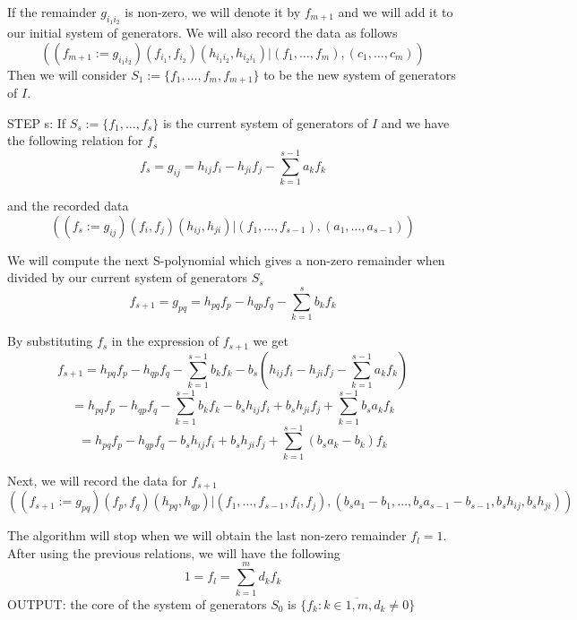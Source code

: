 \documentclass{article}
\theoremstyle{plain}
\begin{document}
If the remainder $g_{i_1i_2}$ is non-zero, we will denote it by $f_{m+1}$ and we will add it to our initial system of generators. We will also record the data as follows
$$((f_{m+1}:=g_{i_1i_2})(f_{i_1},f_{i_2})(h_{i_1i_2},h_{i_2i_1})| (f_1,\ldots,f_m),(c_1,\ldots,c_m))$$ 
Then we will consider $S_1:=\{f_1,\ldots,f_m,f_{m+1}\}$ to be the new system of generators of $I$.

STEP s:  If $S_s:=\{f_1,\ldots,f_{s}\}$ is the current system of generators of $I$ and we have the following relation for $f_s$
$$f_s=g_{ij}=h_{ij}f_i-h_{ji}f_j-\displaystyle\sum_{k=1}^{s-1} a_kf_k$$

and the recorded data 
$$((f_{s}:=g_{ij})(f_{i},f_{j})(h_{ij},h_{ji})| (f_1,\ldots,f_{s-1}),(a_1,\ldots,a_{s-1}))$$

We will compute the next S-polynomial which gives a non-zero remainder when divided by our current system of generators $S_s$
$$f_{s+1}=g_{pq}=h_{pq}f_p-h_{qp}f_q-\displaystyle\sum_{k=1}^s b_kf_k$$
  
By substituting $f_s$ in the expression of $f_{s+1}$ we get 
$$f_{s+1}= h_{pq}f_p-h_{qp}f_q-\displaystyle\sum_{k=1}^{s-1} b_kf_k-b_s(h_{ij}f_i-h_{ji}f_j-\displaystyle\sum_{k=1}^{s-1} a_kf_k)$$
$$= h_{pq}f_p-h_{qp}f_q-\displaystyle\sum_{k=1}^{s-1} b_kf_k-b_sh_{ij}f_i+b_sh_{ji}f_j+\displaystyle\sum_{k=1}^{s-1} b_sa_kf_k$$
$$= h_{pq}f_p-h_{qp}f_q-b_sh_{ij}f_i+b_sh_{ji}f_j+\displaystyle\sum_{k=1}^{s-1} (b_sa_k-b_k)f_k$$

 Next, we will record the data for $f_{s+1}$
$$((f_{s+1}:=g_{pq})(f_{p},f_{q})(h_{pq},h_{qp})| (f_1,\ldots,f_{s-1},f_i,f_j),(b_sa_1-b_1,\ldots,b_sa_{s-1}-b_{s-1},b_sh_{ij},b_sh_{ji}))$$


The algorithm will stop when we will obtain the last non-zero remainder $f_l=1$. After using the previous relations, we will have the following
$$1=f_l=\displaystyle\sum_{k=1}^{m} d_kf_k$$
OUTPUT:
the core of the system of generators $S_0$ is $\{f_k: k\in\overline{1,m}, d_k\neq 0\}$
        
\end{document}
